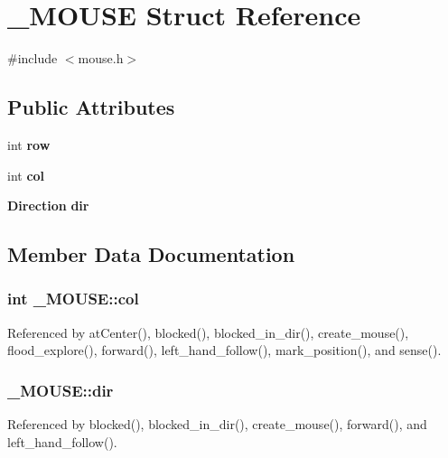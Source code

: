 \section{\-\_\-\-M\-O\-U\-S\-E Struct Reference}
\label{struct__MOUSE}


{\ttfamily \#include $<$mouse.\-h$>$}

\subsection*{Public Attributes}
\begin{DoxyCompactItemize}
\item 
int {\bf row}
\item 
int {\bf col}
\item 
{\bf Direction} {\bf dir}
\end{DoxyCompactItemize}


\subsection{Member Data Documentation}
\subsubsection[{col}]{\setlength{\rightskip}{0pt plus 5cm}int \-\_\-\-M\-O\-U\-S\-E\-::col}\label{struct__MOUSE_af473aaf6728c4d711e558d81af672725}


Referenced by at\-Center(), blocked(), blocked\-\_\-in\-\_\-dir(), create\-\_\-mouse(), flood\-\_\-explore(), forward(), left\-\_\-hand\-\_\-follow(), mark\-\_\-position(), and sense().

\subsubsection[{dir}]{ \-\_\-\-M\-O\-U\-S\-E\-::dir}\label{struct__MOUSE_a53f0244726c310c83c8fc413757252ff}


Referenced by blocked(), blocked\-\_\-in\-\_\-dir(), create\-\_\-mouse(), forward(), and left\-\_\-hand\-\_\-follow().

